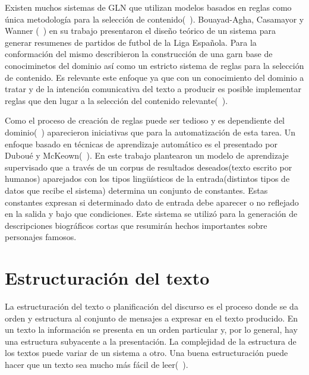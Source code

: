     Existen muchos sistemas de GLN que utilizan modelos basados en reglas como \'unica metodolog\'ia para la selecci\'on de contenido(~\cite{reiter_dale_2000,Perera2017RecentAI}). Bouayad-Agha, Casamayor y 
Wanner (~\cite{BouayadAgha2011ContentSF}) en su trabajo presentaron el dise\~no te\'orico de un sistema para generar resumenes de partidos de 
futbol de la Liga Espa\~nola. Para la conformaci\'on del mismo describieron la construcci\'on de una garn base de conociminetos del dominio as\'i como 
un estricto sistema de reglas para la selecci\'on de contenido. Es relevante este enfoque ya que con un conocimiento del dominio a tratar y de la intenci\'on comunicativa del texto a producir 
es posible implementar reglas que den lugar a la selección del contenido relevante(~\cite{Reiter1997BuildingAN,reiter_dale_2000}). 

    Como el proceso de creaci\'on de reglas puede ser tedioso y es dependiente del dominio(~\cite{Reiter1997BuildingAN}) aparecieron iniciativas que para la automatizaci\'on de esta tarea. Un enfoque 
basado en t\'ecnicas de aprendizaje autom\'atico es el presentado por Dubou\'e y McKeown(~\cite{Dubou2003StatisticalAO}). En este trabajo plantearon un modelo de aprendizaje supervisado que a trav\'es de
un corpus de resultados deseados(texto escrito por humanos) aparejados con los tipos lingüísticos de la entrada(distintos tipos de datos que recibe el sistema) determina un conjunto de constantes. Estas constantes 
expresan si determinado dato de entrada debe aparecer o no reflejado en la salida y bajo que condiciones. Este sistema se utilizó para la generación de descripciones biográficos cortas que resumirán hechos 
importantes sobre personajes famosos.

\section{Estructuración del texto}

    La estructuración del texto o planificación del discurso es el proceso donde se da orden y estructura al conjunto de mensajes a expresar en el texto producido. En un texto la información se presenta en un orden particular 
y, por lo general, hay una estructura subyacente a la presentación. La complejidad de la estructura de los textos puede variar de un sistema a otro. Una buena estructuración puede hacer que un texto sea mucho más fácil 
de leer(~\cite{Reiter1997BuildingAN}).

